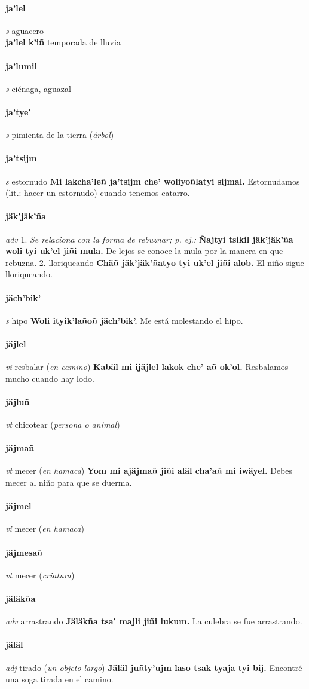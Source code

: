 \documentclass{scrbook}
\newcommand{\entry}[1]{\paragraph{#1}}
\newcommand{\onedefinition}[1]{#1.}
\newcommand{\nontranslationdef}[1]{\textit{#1}}
\newcommand{\partofspeech}[1]{\textit{#1}}
\newcommand{\spanishtranslation}[1]{#1}
\newcommand{\clarification}[1]{(\textit{#1})}
\newcommand{\cholexample}[1]{\textbf{#1}}
\newcommand{\exampletranslation}[1]{#1}
\newcommand{\secondaryentry}[1]{\\\textbf{#1}}
\newcommand{\secondtranslation}[1]{#1}
\begin{document}
\begin{multicols}{2}
\entry{ja'lel}
\partofspeech{s}
\spanishtranslation{aguacero}
\secondaryentry{ja'lel k'iñ}
\secondtranslation{temporada de lluvia}

\entry{ja'lumil}
\partofspeech{s}
\spanishtranslation{ciénaga, aguazal}

\entry{ja'tye'}
\partofspeech{s}
\spanishtranslation{pimienta de la tierra}
\clarification{árbol}

\entry{ja'tsijm}
\partofspeech{s}
\spanishtranslation{estornudo}
\cholexample{Mi lakcha'leñ ja'tsijm che' woliyoñlatyi sijmal.}
\exampletranslation{Estornudamos (lit.: hacer un estornudo) cuando tenemos catarro.}

\entry{jäk'jäk'ña}
\partofspeech{adv}
\onedefinition{1}
\nontranslationdef{Se relaciona con la forma de rebuznar; p. ej.:}
\cholexample{Ñajtyi tsikil jäk'jäk'ña woli tyi uk'el jiñi mula.}
\exampletranslation{De lejos se conoce la mula por la manera en que rebuzna.}
\onedefinition{2}
\spanishtranslation{lloriqueando}
\cholexample{Chäñ jäk'jäk'ñatyo tyi uk'el jiñi alob.}
\exampletranslation{El niño sigue lloriqueando.}

\entry{jäch'bik'}
\partofspeech{s}
\spanishtranslation{hipo}
\cholexample{Woli ityik'lañoñ jäch'bik'.}
\exampletranslation{Me está molestando el hipo.}

\entry{jäjlel}
\partofspeech{vi}
\spanishtranslation{resbalar}
\clarification{en camino}
\cholexample{Kabäl mi ijäjlel lakok che' añ ok'ol.}
\exampletranslation{Resbalamos mucho cuando hay lodo.}

\entry{jäjluñ}
\partofspeech{vt}
\spanishtranslation{chicotear}
\clarification{persona o animal}

\entry{jäjmañ}
\partofspeech{vt}
\spanishtranslation{mecer}
\clarification{en hamaca}
\cholexample{Yom mi ajäjmañ jiñi aläl cha'añ mi iwäyel.}
\exampletranslation{Debes mecer al niño para que se duerma.}

\entry{jäjmel}
\partofspeech{vi}
\spanishtranslation{mecer}
\clarification{en hamaca}

\entry{jäjmesañ}
\partofspeech{vt}
\spanishtranslation{mecer}
\clarification{criatura}

\entry{jäläkña}
\partofspeech{adv}
\spanishtranslation{arrastrando}
\cholexample{Jäläkña tsa' majli jiñi lukum.}
\exampletranslation{La culebra se fue arrastrando.}

\entry{jäläl}
\partofspeech{adj}
\spanishtranslation{tirado}
\clarification{un objeto largo}
\cholexample{Jäläl juñty'ujm laso tsak tyaja tyi bij.}
\exampletranslation{Encontré una soga tirada en el camino.}


\end{multicols}
\end{document}
